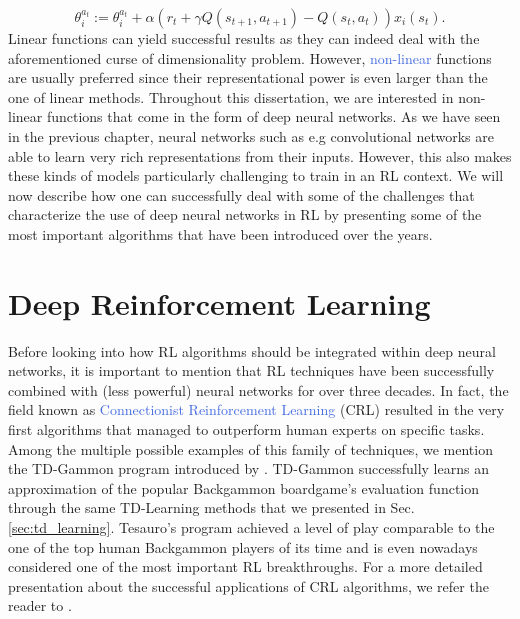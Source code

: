 \begin{equation}
	\theta^{a_t}_{i} := \theta^{a_t}_{i} + \alpha(r_t +\gamma Q(s_{t+1},a_{t+1}) - Q(s_t, a_t)) x_i(s_t).
\end{equation}
Linear functions can yield successful results \cite{lane1992theory, park1993approximation, mcculloch1943logical} as they can indeed deal with the aforementioned curse of dimensionality problem. However, \textcolor{RoyalBlue}{non-linear} functions are usually preferred since their representational power is even larger than the one of linear methods. Throughout this dissertation, we are interested in non-linear functions that come in the form of deep neural networks. As we have seen in the previous chapter, neural networks such as e.g convolutional networks are able to learn very rich representations from their inputs. However, this also makes these kinds of models particularly challenging to train in an RL context. We will now describe how one can successfully deal with some of the challenges that characterize the use of deep neural networks in RL by presenting some of the most important algorithms that have been introduced over the years.    

\section{Deep Reinforcement Learning}
\label{sec:deep_reinforcement_learning}
Before looking into how RL algorithms should be integrated within deep neural networks, it is important to mention that RL techniques have been successfully combined with (less powerful) neural networks for over three decades. In fact, the field known as \textcolor{RoyalBlue}{Connectionist Reinforcement Learning} (CRL) resulted in the very first algorithms that managed to outperform human experts on specific tasks. Among the multiple possible examples of this family of techniques, we mention the TD-Gammon program introduced by \citet{tesauro1994td}. TD-Gammon successfully learns an approximation of the popular Backgammon boardgame's evaluation function through the same TD-Learning methods that we presented in Sec. \ref{sec:td_learning}. Tesauro's program achieved a level of play comparable to the one of the top human Backgammon players of its time and is even nowadays considered one of the most important RL breakthroughs. For a more detailed presentation about the successful applications of CRL algorithms, we refer the reader to \cite{bucsoniu2011approximate}.  

